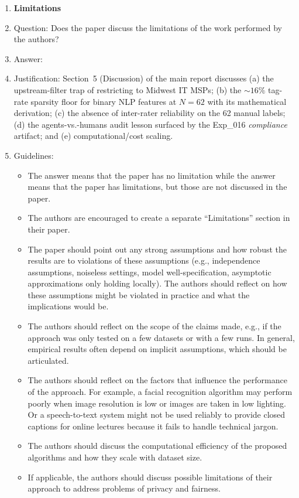 \documentclass{article}
\begin{document}
\begin{enumerate}
\item {\bf Limitations}
    \item[] Question: Does the paper discuss the limitations of the work performed by the authors?
    \item[] Answer: \answerYes{}
    \item[] Justification: Section~5 (Discussion) of the main report discusses (a) the upstream-filter trap of restricting to Midwest IT MSPs; (b) the $\sim 16\%$ tag-rate sparsity floor for binary NLP features at $N{=}62$ with its mathematical derivation; (c) the absence of inter-rater reliability on the 62 manual labels; (d) the agents-vs.-humans audit lesson surfaced by the Exp\_016 \emph{compliance} artifact; and (e) computational/cost scaling.
    \item[] Guidelines:
    \begin{itemize}
        \item The answer \answerNA{} means that the paper has no limitation while the answer \answerNo{} means that the paper has limitations, but those are not discussed in the paper.
        \item The authors are encouraged to create a separate ``Limitations'' section in their paper.
        \item The paper should point out any strong assumptions and how robust the results are to violations of these assumptions (e.g., independence assumptions, noiseless settings, model well-specification, asymptotic approximations only holding locally). The authors should reflect on how these assumptions might be violated in practice and what the implications would be.
        \item The authors should reflect on the scope of the claims made, e.g., if the approach was only tested on a few datasets or with a few runs. In general, empirical results often depend on implicit assumptions, which should be articulated.
        \item The authors should reflect on the factors that influence the performance of the approach. For example, a facial recognition algorithm may perform poorly when image resolution is low or images are taken in low lighting. Or a speech-to-text system might not be used reliably to provide closed captions for online lectures because it fails to handle technical jargon.
        \item The authors should discuss the computational efficiency of the proposed algorithms and how they scale with dataset size.
        \item If applicable, the authors should discuss possible limitations of their approach to address problems of privacy and fairness.

\end{itemize}
\end{enumerate}
\end{document}
